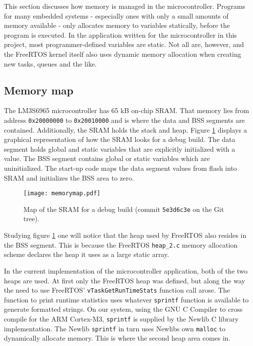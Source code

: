 This section discusses how memory is managed in the microcontroller. Programs for many embedded systems - especially ones with only a small amounts of memory available - only allocates memory to variables statically, before the program is executed. In the application written for the microcontroller in this project, most programmer-defined variables are static. Not all are, however, and the FreeRTOS kernel itself also uses dynamic memory allocation when creating new tasks, queues and the like. 


\subsection{Memory map}
The LM3S6965 microcontroller has 65 kB on-chip SRAM. That memory lies from address \texttt{0x20000000} to \texttt{0x20010000} \cite[71]{lm3s6965} and is where the data and BSS segments are contained. Additionally, the SRAM holds the stack and heap. Figure \ref{fig:memmap} displays a graphical representation of how the SRAM looks for a debug build. The data segment holds global and static variables that are explicitly initialized with a value. The BSS segment contains global or static variables which are uninitialized. The start-up code maps the data segment values from flash into SRAM and initializes the BSS area to zero.

\begin{figure}[htb]
	\centering
	\texttt{[image: memorymap.pdf]}%
	\caption{Map of the SRAM for a debug build (commit \texttt{5e3d6c3e} on the Git tree).}
	\label{fig:memmap}
\end{figure}

Studying figure \ref{fig:memmap} one will notice that the heap used by FreeRTOS also resides in the BSS segment. This is because the FreeRTOS \texttt{heap\_2.c} memory allocation scheme declares the heap it uses as a large static array.

In the current implementation of the microcontroller application, both of the two heaps are used. At first only the FreeRTOS heap was defined, but along the way the need to use FreeRTOS' \texttt{vTaskGetRunTimeStats} function call arose. The function to print runtime statistics uses whatever \texttt{sprintf} function is available to generate formatted strings. On our system, using the GNU C Compiler to cross compile for the ARM Cortex-M3, \texttt{sprintf} is supplied by the Newlib C library implementation. The Newlib \texttt{sprintf} in turn uses Newlibs own \texttt{malloc} to dynamically allocate memory. This is where the second heap area comes in.

